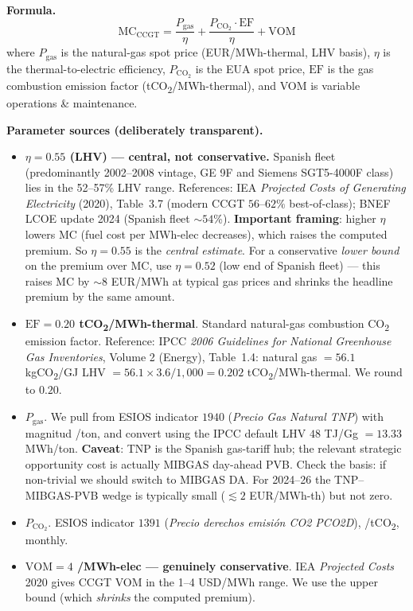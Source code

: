 \documentclass[11pt,a4paper]{article}
\begin{document}
\textbf{Formula.}
\[
\mathrm{MC}_{\text{CCGT}} = \frac{P_{\text{gas}}}{\eta} + \frac{P_{\text{CO}_2} \cdot \mathrm{EF}}{\eta} + \mathrm{VOM}
\]
where $P_{\text{gas}}$ is the natural-gas spot price (EUR/MWh-thermal, LHV basis), $\eta$ is the thermal-to-electric efficiency, $P_{\text{CO}_2}$ is the EUA spot price, $\mathrm{EF}$ is the gas combustion emission factor (tCO\textsubscript{2}/MWh-thermal), and VOM is variable operations \& maintenance.

\textbf{Parameter sources (deliberately transparent).}
\begin{itemize}\setlength{\itemsep}{1pt}
\item \textbf{$\eta = 0.55$ (LHV) --- central, not conservative.} Spanish fleet (predominantly 2002--2008 vintage, GE 9F and Siemens SGT5-4000F class) lies in the 52--57\% LHV range. References: IEA \emph{Projected Costs of Generating Electricity} (2020), Table~3.7 (modern CCGT $56$--$62\%$ best-of-class); BNEF LCOE update 2024 (Spanish fleet $\sim 54$\%). \textbf{Important framing}: higher $\eta$ lowers MC (fuel cost per MWh-elec decreases), which raises the computed premium. So $\eta = 0.55$ is the \emph{central estimate}. For a conservative \emph{lower bound} on the premium over MC, use $\eta = 0.52$ (low end of Spanish fleet) --- this raises MC by $\sim 8$ EUR/MWh at typical gas prices and shrinks the headline premium by the same amount.
\item \textbf{$\mathrm{EF} = 0.20$ tCO\textsubscript{2}/MWh-thermal}. Standard natural-gas combustion CO\textsubscript{2} emission factor. Reference: IPCC \emph{2006 Guidelines for National Greenhouse Gas Inventories}, Volume 2 (Energy), Table~1.4: natural gas $= 56.1$ kgCO\textsubscript{2}/GJ LHV $= 56.1 \times 3.6 / 1{,}000 = 0.202$ tCO\textsubscript{2}/MWh-thermal. We round to $0.20$.
\item \textbf{$P_{\text{gas}}$}. We pull from ESIOS indicator $1940$ (\emph{Precio Gas Natural TNP}) with magnitud \texteuro/ton, and convert using the IPCC default LHV $48$ TJ/Gg $= 13.33$ MWh/ton. \textbf{Caveat}: TNP is the Spanish gas-tariff hub; the relevant strategic opportunity cost is actually MIBGAS day-ahead PVB. Check the basis: if non-trivial we should switch to MIBGAS DA. For 2024--26 the TNP--MIBGAS-PVB wedge is typically small ($\lesssim 2$ EUR/MWh-th) but not zero.
\item \textbf{$P_{\text{CO}_2}$}. ESIOS indicator $1391$ (\emph{Precio derechos emisión CO2 PCO2D}), \texteuro/tCO\textsubscript{2}, monthly.
\item \textbf{$\mathrm{VOM} = 4$ \texteuro/MWh-elec --- genuinely conservative}. IEA \emph{Projected Costs} 2020 gives CCGT VOM in the 1--4 USD/MWh range. We use the upper bound (which \emph{shrinks} the computed premium).

\end{itemize}
\end{document}

